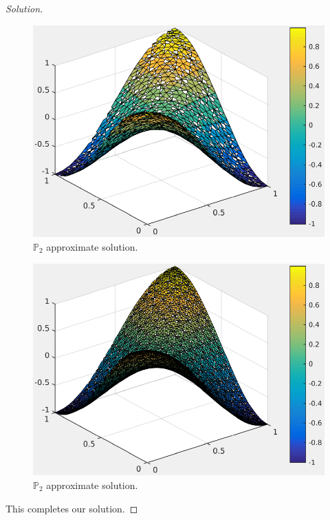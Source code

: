 \documentclass[11pt,a4paper,center,notitlepage]{article}
\numberwithin{equation}{section}
\begin{document}
\begin{proof}[Solution]
\begin{figure}[H]
\centering
\includegraphics[scale=0.9]{appro_solution_4_P2}
\caption{$\mathbb{P}_2$ approximate solution.}
\end{figure}

\begin{figure}[H]
\centering
\includegraphics[scale=0.9]{appro_solution_5_P2}
\caption{$\mathbb{P}_2$ approximate solution.}
\end{figure}  

This completes our solution.
\end{proof}
\end{document}
